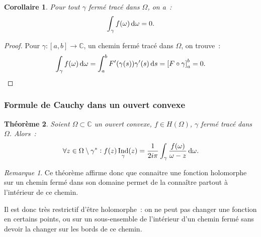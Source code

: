 \documentclass{report}
\newtheorem{thm}{Théorème}[chapter]
\newtheorem{cor}[thm]{Corollaire}
\theoremstyle{definition}
\theoremstyle{remark}
\newtheorem*{rmq}{Remarque}
\numberwithin{equation}{section}
\newcommand{\C}{\mathbb C}
\DeclareMathOperator{\Ind}{Ind}
\begin{document}
			\begin{cor} Pour tout $\gamma$ fermé tracé dans $\Omega$, on a~:
			\begin{equation}
				\int_\gamma f(\omega)\dif \omega = 0.
			\end{equation}
			\end{cor}

			\begin{proof} Pour $\gamma : [a, b] \to \C$, un chemin fermé tracé dans $\Omega$, on trouve~:
			\begin{equation}
				\int_\gamma f(\omega)\dif \omega = \int_a^bF'(\gamma(s))\gamma'(s)\dif s = \left[F \circ \gamma\right]_a^b = 0.
			\end{equation}
			\end{proof}

		\subsubsection{Formule de Cauchy dans un ouvert convexe}
			\begin{thm} Soient $\Omega \subset \C$ un ouvert convexe, $f \in H(\Omega)$, $\gamma$ fermé tracé dans $\Omega$. Alors~:
			\begin{equation}
				\forall z \in \Omega \setminus \gamma^* : f(z)\Ind_\gamma(z) = \frac 1{2i\pi}\int_\gamma\frac {f(\omega)}{\omega - z}\dif \omega.
			\end{equation}
			\end{thm}

			\begin{rmq} Ce théorème affirme donc que connaitre une fonction holomorphe sur un chemin fermé dans son domaine permet de la connaître partout à
			l'intérieur de ce chemin.

			Il est donc très restrictif d'être holomorphe~: on ne peut pas changer une fonction en certains points, ou sur un sous-ensemble de l'intérieur d'un
			chemin fermé sans devoir la changer sur les bords de ce chemin.
			\end{rmq}
\end{document}
